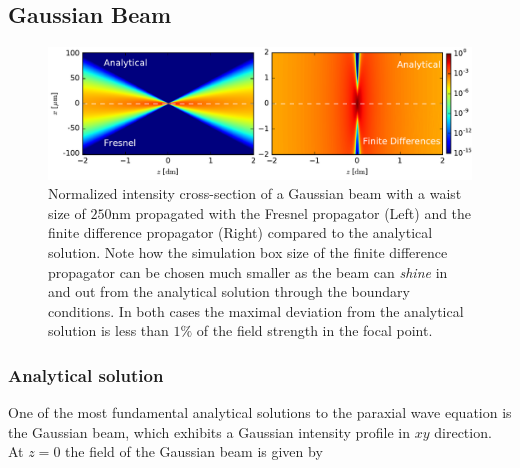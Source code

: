 

\subsection{Gaussian Beam}

\begin{figure}[h!]
    \centering

    \includegraphics[width=1\textwidth]{analytical/analytical_gauss_fdfr}
    
    \caption{Normalized intensity cross-section of a Gaussian beam with a waist size of $250\text{nm}$ propagated with the Fresnel propagator (Left) and the finite difference propagator (Right) compared to the analytical solution. Note how the simulation box size of the finite difference propagator can be chosen much smaller as the beam can \emph{shine} in and out from the analytical solution through the boundary conditions. In both cases the maximal deviation from the analytical solution is less than $1\%$ of the field strength in the focal point.}
    
    
    \label{fig:gauss_analytical_comparison}
\end{figure}


\subsubsection{Analytical solution}

One of the most fundamental analytical solutions to the paraxial wave equation is the Gaussian beam, which exhibits a Gaussian intensity profile in $xy$ direction. At $z = 0$ the field of the Gaussian beam is given by

